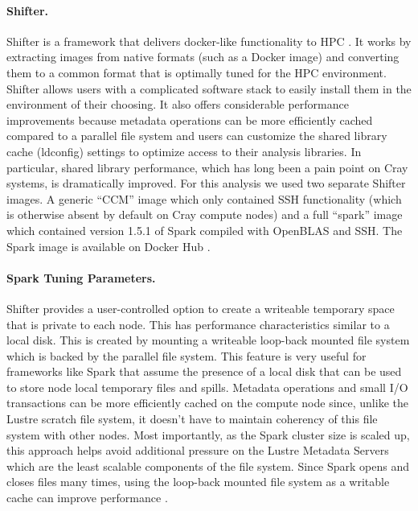 \paragraph{Shifter.}
Shifter is a framework that delivers docker-like functionality to HPC \cite{shifter}. It works by extracting images from native formats (such as a Docker image) and converting them to a common format that is optimally tuned for the HPC environment. %
Shifter allows users with a complicated software stack to easily install them in the environment of their choosing. It also offers considerable performance improvements because metadata operations can be more efficiently cached compared to a parallel file system and users can customize the shared library cache (ldconfig) settings to optimize access to their analysis libraries. In particular, shared library performance, which has long been a pain point on Cray systems, is dramatically improved. For this analysis we used two separate Shifter images. A generic “CCM” image which only contained SSH functionality (which is otherwise absent by default on Cray compute nodes) and a full “spark” image which contained version 1.5.1 of Spark  compiled with OpenBLAS \cite{openblas} and SSH. The Spark image is available on Docker Hub \cite{dockerspark}. 

\paragraph{Spark Tuning Parameters.}
Shifter provides a user-controlled option to create a writeable temporary space that is private to each node. This has performance characteristics similar to a local disk. This is created by mounting a writeable loop-back mounted file system which is backed by the parallel file system. This feature is very useful for frameworks like Spark that assume the presence of a local disk that can be used to store node local temporary files and spills. Metadata operations and small I/O transactions can  be more efficiently cached on the compute node since, unlike the Lustre scratch file system, it doesn't have to maintain coherency of this file system with other nodes. Most importantly, as the Spark cluster size is scaled up, this approach helps avoid additional pressure on the Lustre Metadata Servers which are the least scalable components of the file system. Since Spark opens and closes files many times, using the loop-back mounted file system as a writable cache can improve performance \cite{scalingspark16}.

